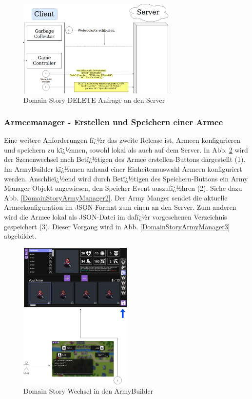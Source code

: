 \documentclass[12pt, titlepage]{scrartcl}
\begin{document}
		\begin{figure}[H] 
			\centering
			\includegraphics[width=0.7\textwidth]{BackToLobby3.png}
			\caption{Domain Story DELETE Anfrage an den Server}
			\label{DomainStoryZurueckDelete}
		\end{figure} 
		\subsubsection{Armeemanager - Erstellen und Speichern einer Armee}
		Eine weitere Anforderungen fï¿½r das zweite Release ist, Armeen konfigurieren und speichern zu kï¿½nnen, sowohl lokal als auch auf dem Server. In Abb. \ref{DomainStoryArmyManager1} wird der Szenenwechsel nach Betï¿½tigen des Armee erstellen-Buttons dargestellt (1). Im ArmyBuilder kï¿½nnen anhand einer Einheitenauswahl Armeen konfiguriert werden. Anschlieï¿½end wird durch Betï¿½tigen des Speichern-Buttons ein Army Manager Objekt angewiesen, den Speicher-Event auszufï¿½hren (2). Siehe dazu Abb. \ref{DomainStoryArmyManager2}. Der Army Manger sendet die aktuelle Armeekonfiguration im JSON-Format zum einen an den Server. Zum anderen wird die Armee lokal als JSON-Datei im dafï¿½r vorgesehenen Verzeichnis gespeichert (3). Dieser Vorgang wird in Abb. \ref{DomainStoryArmyManager3} abgebildet.
			\begin{figure}[H] 
				\centering
				\includegraphics[width=0.5\textwidth]{ArmyManager1.png}
				\caption{Domain Story Wechsel in den ArmyBuilder}
				\label{DomainStoryArmyManager1}
			\end{figure}
\end{document}
